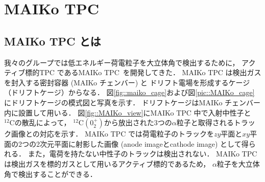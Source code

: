 \documentclass[../master]{subfiles}
\begin{document}
\chapter{MAIKo TPC}
\section{MAIKo TPC とは}
我々のグループでは低エネルギー荷電粒子を大立体角で検出するために，
アクティブ標的TPC であるMAIKo TPC~\cite{MAIKo}を開発してきた．
MAIKo TPC は検出ガスを封入する密封容器 (MAIKo チェンバー) と
ドリフト電場を形成するケージ（ドリフトケージ）からなる．
図\ref{fig::maiko_cage}および図\ref{pic::MAIKo_cage}にドリフトケージの模式図と写真を示す．
ドリフトケージはMAIKo チェンバー内に設置して用いる．
図\ref{fig::MAIKo_view}にMAIKo TPC 中で入射中性子と${}^{12}\mathrm{C}$の散乱によって，
${}^{12}\mathrm{C} (0_2^+)$から放出された3つの$\alpha$粒子と取得されるトラック画像との対応を示す．
MAIKo TPC では荷電粒子のトラックを$zy$平面と$xy$平面の2つの2次元平面に射影した画像
(anode imageとcathode image) として得られる．
また，電荷を持たない中性子のトラックは検出されない．
MAIKo TPC は検出ガスを標的ガスとして用いるアクティブ標的であるため，
$\alpha$粒子を大立体角で検出することができる．
\end{document}
